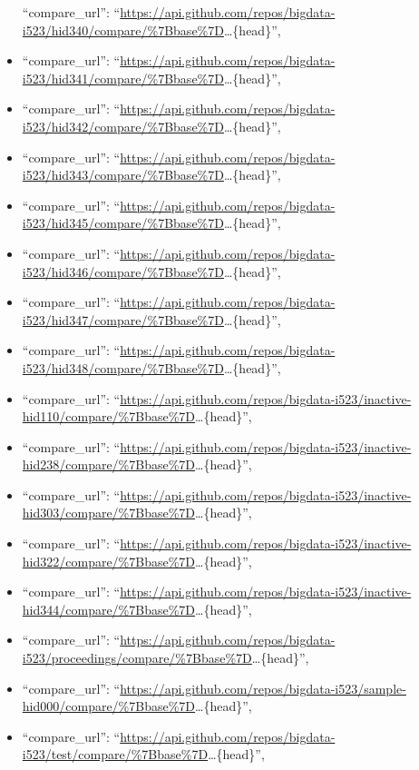 \begin{itemize}
  ``compare\_url'':
  ``\url{https://api.github.com/repos/bigdata-i523/hid340/compare/\%7Bbase\%7D}\ldots{}\{head\}'',
\item
  ``compare\_url'':
  ``\url{https://api.github.com/repos/bigdata-i523/hid341/compare/\%7Bbase\%7D}\ldots{}\{head\}'',
\item
  ``compare\_url'':
  ``\url{https://api.github.com/repos/bigdata-i523/hid342/compare/\%7Bbase\%7D}\ldots{}\{head\}'',
\item
  ``compare\_url'':
  ``\url{https://api.github.com/repos/bigdata-i523/hid343/compare/\%7Bbase\%7D}\ldots{}\{head\}'',
\item
  ``compare\_url'':
  ``\url{https://api.github.com/repos/bigdata-i523/hid345/compare/\%7Bbase\%7D}\ldots{}\{head\}'',
\item
  ``compare\_url'':
  ``\url{https://api.github.com/repos/bigdata-i523/hid346/compare/\%7Bbase\%7D}\ldots{}\{head\}'',
\item
  ``compare\_url'':
  ``\url{https://api.github.com/repos/bigdata-i523/hid347/compare/\%7Bbase\%7D}\ldots{}\{head\}'',
\item
  ``compare\_url'':
  ``\url{https://api.github.com/repos/bigdata-i523/hid348/compare/\%7Bbase\%7D}\ldots{}\{head\}'',
\item
  ``compare\_url'':
  ``\url{https://api.github.com/repos/bigdata-i523/inactive-hid110/compare/\%7Bbase\%7D}\ldots{}\{head\}'',
\item
  ``compare\_url'':
  ``\url{https://api.github.com/repos/bigdata-i523/inactive-hid238/compare/\%7Bbase\%7D}\ldots{}\{head\}'',
\item
  ``compare\_url'':
  ``\url{https://api.github.com/repos/bigdata-i523/inactive-hid303/compare/\%7Bbase\%7D}\ldots{}\{head\}'',
\item
  ``compare\_url'':
  ``\url{https://api.github.com/repos/bigdata-i523/inactive-hid322/compare/\%7Bbase\%7D}\ldots{}\{head\}'',
\item
  ``compare\_url'':
  ``\url{https://api.github.com/repos/bigdata-i523/inactive-hid344/compare/\%7Bbase\%7D}\ldots{}\{head\}'',
\item
  ``compare\_url'':
  ``\url{https://api.github.com/repos/bigdata-i523/proceedings/compare/\%7Bbase\%7D}\ldots{}\{head\}'',
\item
  ``compare\_url'':
  ``\url{https://api.github.com/repos/bigdata-i523/sample-hid000/compare/\%7Bbase\%7D}\ldots{}\{head\}'',
\item
  ``compare\_url'':
  ``\url{https://api.github.com/repos/bigdata-i523/test/compare/\%7Bbase\%7D}\ldots{}\{head\}'',

\end{itemize}
